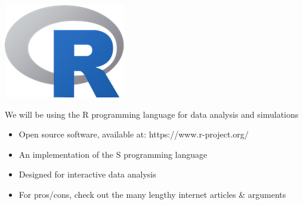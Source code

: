 \begin{frame}[fragile] \frametitle{}

\noindent
\begin{minipage}{0.5\textwidth}
\includegraphics[width=0.75\linewidth]{img/Rlogo.png}
\end{minipage}%
\begin{minipage}{0.5\textwidth}
We will be using the R programming language for data analysis and simulations \\
\begin{itemize}
\item Open source software, available at: https://www.r-project.org/
\item An implementation of the S programming language
\item Designed for interactive data analysis
\item For pros/cons, check out the many lengthy internet articles \& arguments
\end{itemize}
\end{minipage}

\end{frame}


